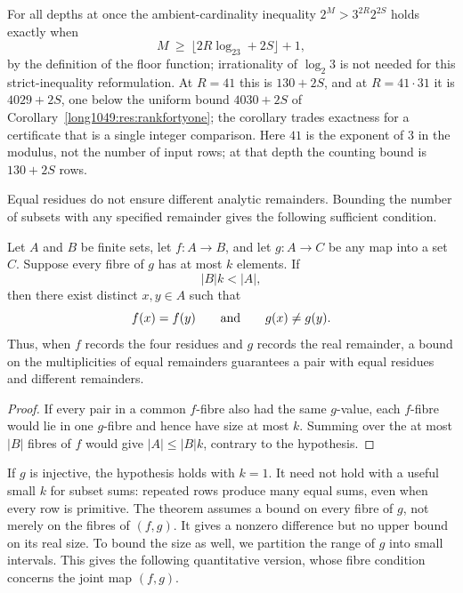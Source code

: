 \documentclass[11pt]{article}
\begin{document}
For all depths at once the ambient-cardinality inequality $2^{M}>3^{2R}2^{2S}$
holds exactly when
\[
 M\ \ge\ \bigl\lfloor2R\log_23+2S\bigr\rfloor+1,
\]
by the definition of the floor function; irrationality of $\log_2 3$
is not needed for this strict-inequality reformulation.
At $R=41$ this is $130+2S$, and
at $R=41\cdot31$ it is $4029+2S$, one below the uniform bound $4030+2S$ of
Corollary~\ref{long1049:res:rankfortyone}; the corollary trades exactness for a
certificate that is a single integer comparison.  Here $41$ is the exponent of $3$ in the modulus, not the number of
input rows; at that depth the counting bound is $130+2S$ rows.

Equal residues do not ensure different analytic remainders. Bounding
the number of subsets with any specified remainder gives the following
sufficient condition.

\begin{theorem}\label{long1049:res:boundedfibre}
Let $A$ and $B$ be finite sets, let $f:A\to B$, and let $g:A\to C$ be any
map into a set $C$.  Suppose every fibre of $g$ has at most $k$ elements.  If
\[
 |B|k<|A|,
\]
then there exist distinct $x,y\in A$ such that
\[
 f(x)=f(y)\qquad\hbox{and}\qquad g(x)\ne g(y).
\]
Thus, when $f$ records the four residues and $g$ records the real
remainder, a bound on the multiplicities of equal remainders guarantees
a pair with equal residues and different remainders.
\end{theorem}

\begin{proof}
If every pair in a common $f$-fibre also had the same $g$-value, each
$f$-fibre would lie in one $g$-fibre and hence have size at most $k$.
Summing over the at most $|B|$ fibres of $f$ would give
$|A|\le |B|k$, contrary to the hypothesis.
\end{proof}

If $g$ is injective, the hypothesis holds with $k=1$. It need not hold
with a useful small $k$ for subset sums: repeated rows produce
many equal sums, even when every row is primitive. The theorem assumes
a bound on every fibre of $g$, not merely on the fibres of $(f,g)$.
It gives a nonzero difference but no upper bound on its real size.
To bound the size as well, we partition the range of $g$ into small
intervals. This gives the following quantitative version, whose fibre
condition concerns the joint map $(f,g)$.
\end{document}
